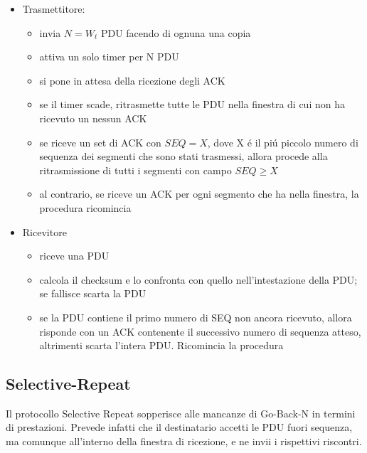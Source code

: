 \documentclass[12pt]{article}
\begin{document}
\begin{itemize}[noitemsep]
	\item Trasmettitore:
	\begin{itemize}[noitemsep]
		\item invia $N=W_t$ PDU facendo di ognuna una copia
		\item attiva un solo timer per N PDU
		\item si pone in attesa della ricezione degli ACK
		\item se il timer scade, ritrasmette tutte le PDU nella finestra di cui non ha ricevuto un nessun ACK
		\item se riceve un set di ACK con $SEQ=X$, dove X \'e il pi\'u piccolo numero di sequenza dei segmenti che 
		      sono stati trasmessi, allora procede alla ritrasmissione di tutti i segmenti con campo $SEQ \geq X$
	    \item al contrario, se riceve un ACK per ogni segmento che ha nella finestra, la procedura ricomincia
	\end{itemize}
	\item Ricevitore
    \begin{itemize}[noitemsep]
        \item riceve una PDU
   		\item calcola il checksum e lo confronta con quello nell'intestazione della PDU; se fallisce scarta la PDU
		\item se la PDU contiene il primo numero di SEQ non ancora ricevuto, allora risponde con un ACK contenente il 
		      successivo numero di sequenza atteso, altrimenti scarta l'intera PDU. Ricomincia la procedura
	\end{itemize}
\end{itemize}

\subsection{Selective-Repeat}\label{arq-selective-repeat}
Il protocollo Selective Repeat sopperisce alle mancanze di Go-Back-N in termini di prestazioni. Prevede infatti che 
il destinatario accetti le PDU fuori sequenza, ma comunque all'interno della finestra di ricezione, e ne invii i 
rispettivi riscontri.
\end{document}
